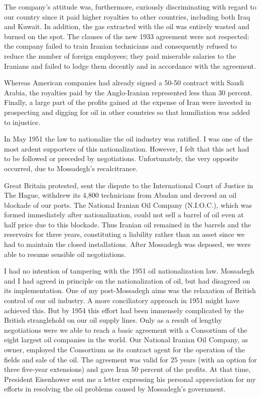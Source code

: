 The company’s attitude was, furthermore, curiously discriminating with regard to our country since it paid higher royalties to other countries, including both Iraq and Kuwait. In addition, the gas extracted with the oil was entirely wasted and burned on the spot. The clauses of the new 1933 agreement were not respected: the company failed to train Iranian technicians and consequently refused to reduce the number of foreign employees; they paid miserable salaries to the Iranians and failed to lodge them decently and in accordance with the agreement. 

Whereas American companies had already signed a 50-50 contract with Saudi Arabia, the royalties paid by the Anglo-Iranian represented less than 30 percent. Finally, a large part of the profits gained at the expense of Iran were invested in prospecting and digging for oil in other countries so that humiliation was added to injustice. 

In May 1951 the law to nationalize the oil industry was ratified. I was one of the most ardent supporters of this nationalization. However, I felt that this act had to be followed or preceded by negotiations. Unfortunately, the very opposite occurred, due to Mossadegh’s recalcitrance. 

Great Britain protested, sent the dispute to the International Court of Justice in The Hague, withdrew its 4,800 technicians from Abadan and decreed an oil blockade of our ports. The National Iranian Oil Company (N.I.O.C.), which was formed immediately after nationalization, could not sell a barrel of oil even at half price due to this blockade. Thus Iranian oil remained in the barrels and the reservoirs for three years, constituting a liability rather than an asset since we had to maintain the closed installations. After Mossadegh was deposed, we were able to resume sensible oil negotiations. 

I had no intention of tampering with the 1951 oil nationalization law. Mossadegh and I had agreed in principle on the nationalization of oil, but had disagreed on its implementation. One of my post-Mossadegh aims was the relaxation of British control of our oil industry. A more conciliatory approach in 1951 might have achieved this. But by 1954 this effort had been immensely complicated by the British stranglehold on our oil supply lines. Only as a result of lengthy negotiations were we able to reach a basic agreement with a Consortium of the eight largest oil companies in the world. Our National Iranian Oil Company, as owner, employed the Consortium as its contract agent for the operation of the fields and sale of the oil. The agreement was valid for 25 years (with an option for three five-year extensions) and gave Iran 50 percent of the profits. At that time, President Eisenhower sent me a letter expressing his personal appreciation for my efforts in resolving the oil problems caused by Mossadegh’s government. 

